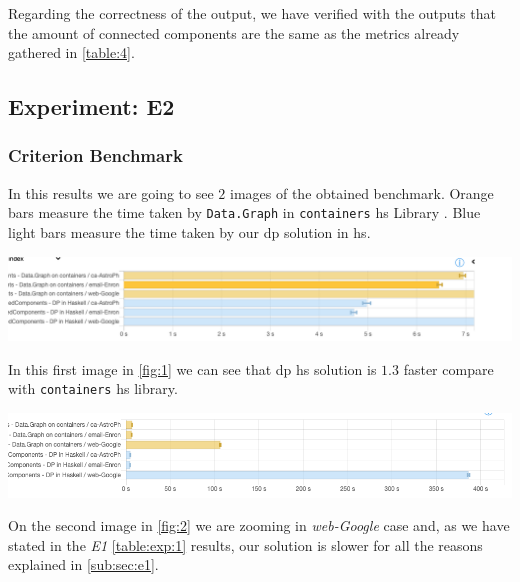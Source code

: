 \documentclass[preprint]{elsarticle}
\begin{document}
Regarding the correctness of the output, we have verified with the outputs that the amount of connected components are the same as the metrics already gathered in \autoref{table:4}.

\subsection{Experiment: E2}
\subsubsection{Criterion Benchmark}
In this results we are going to see $2$ images of the obtained benchmark. Orange bars measure the time taken by \texttt{Data.Graph} in \texttt{containers} \acrshort{hs} Library \cite{containers}. Blue light bars measure the time taken by our \acrshort{dp} solution in \acrshort{hs}.

\begin{minipage}[t]{\linewidth}
  \includegraphics[width=\textwidth]{bench_1.png}
  \captionsetup{type=figure}
  \label{fig:1}
\end{minipage}

In this first image in \autoref{fig:1} we can see that \acrshort{dp} \acrshort{hs} solution is $1.3$ faster compare with \texttt{containers} \acrshort{hs} library.

\begin{minipage}[t]{\linewidth}
  \includegraphics[width=\textwidth]{bench_2}
  \captionsetup{type=figure}
  \label{fig:2}
\end{minipage}

On the second image in \autoref{fig:2} we are zooming in \emph{web-Google} case and, as we have stated in the \emph{E1} \autoref{table:exp:1} results, our solution is slower for all the reasons explained in \autoref{sub:sec:e1}.
\end{document}
